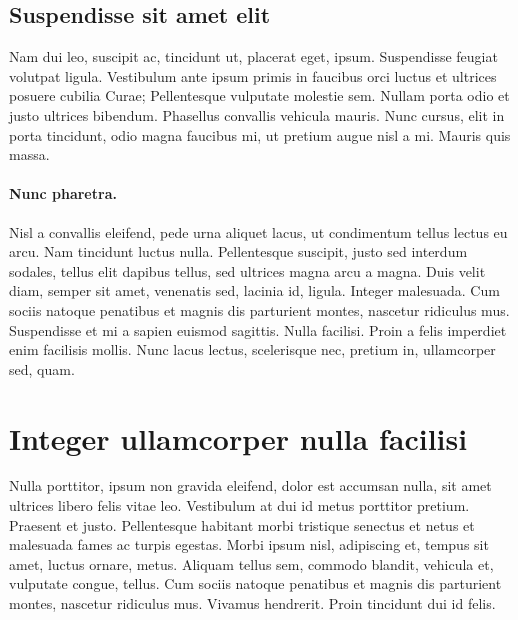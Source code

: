 \subsection[Suspendisse sit amet elit]{Suspendisse sit amet elit}

Nam dui leo, suscipit ac, tincidunt ut, placerat eget, ipsum. Suspendisse feugiat volutpat ligula. Vestibulum ante ipsum primis in faucibus orci luctus et ultrices posuere cubilia Curae; Pellentesque vulputate molestie sem. Nullam porta odio et justo ultrices bibendum. Phasellus convallis vehicula mauris. Nunc cursus, elit in porta tincidunt, odio magna faucibus mi, ut pretium augue nisl a mi. Mauris quis massa. 

\paragraph*{Nunc pharetra.}
Nisl a convallis eleifend, pede urna aliquet lacus, ut condimentum tellus lectus eu arcu. Nam tincidunt luctus nulla. Pellentesque suscipit, justo sed interdum sodales, tellus elit dapibus tellus, sed ultrices magna arcu a magna. Duis velit diam, semper sit amet, venenatis sed, lacinia id, ligula. Integer malesuada. Cum sociis natoque penatibus et magnis dis parturient montes, nascetur ridiculus mus. Suspendisse et mi a sapien euismod sagittis. Nulla facilisi. Proin a felis imperdiet enim facilisis mollis. Nunc lacus lectus, scelerisque nec, pretium in, ullamcorper sed, quam.



%
%
\section[Integer ullamcorper nulla facilisi]{
	Integer ullamcorper nulla facilisi
}

Nulla porttitor, ipsum non gravida eleifend, dolor est accumsan nulla, sit amet ultrices libero felis vitae leo. Vestibulum at dui id metus porttitor pretium. Praesent et justo. Pellentesque habitant morbi tristique senectus et netus et malesuada fames ac turpis egestas. Morbi ipsum nisl, adipiscing et, tempus sit amet, luctus ornare, metus. Aliquam tellus sem, commodo blandit, vehicula et, vulputate congue, tellus. Cum sociis natoque penatibus et magnis dis parturient montes, nascetur ridiculus mus. Vivamus hendrerit. Proin tincidunt dui id felis.

